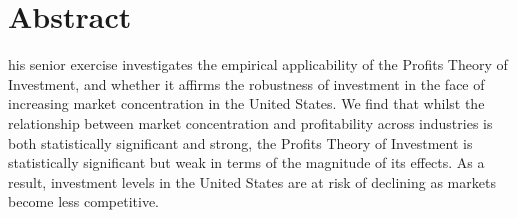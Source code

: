%
%
%



\chapter*{Abstract}
\begin{SingleSpace}
his senior exercise investigates the empirical applicability of the Profits Theory of Investment, and whether it affirms the robustness of investment in the face of increasing market concentration in the United States. We find that whilst the relationship between market concentration and profitability across industries is both statistically significant and strong, the Profits Theory of Investment is statistically significant but weak in terms of the magnitude of its effects. As a result, investment levels in the United States are at risk of declining as markets become less competitive.
\end{SingleSpace}
\clearpage